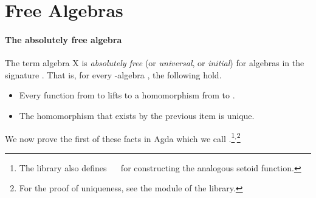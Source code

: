 
\section{Free Algebras}
\label{free-algebras}
\paragraph*{The absolutely free algebra}
The term algebra  \ab X is \emph{absolutely free} (or \emph{universal}, or
\emph{initial}) for algebras in the signature . That is, for every
-algebra , the following hold.

\begin{itemize}
\item Every function from  to  lifts to a homomorphism from   to .
\item The homomorphism that exists by the previous item is unique.
\end{itemize}

We now prove the first of these facts in Agda which we call .\footnote{The
 \agdaalgebras library also defines
  \as{:} ~~
 for constructing the analogous setoid function.}$^,$\footnote{For the proof of uniqueness,
see the  module of the \agdaalgebras library.}

